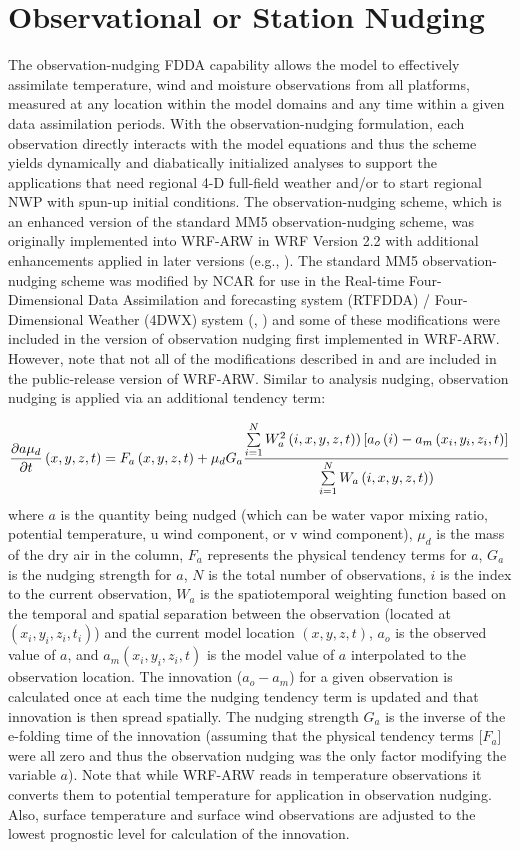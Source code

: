 \section{Observational or Station Nudging}

The observation-nudging FDDA capability allows the model to effectively assimilate temperature, wind and moisture observations from all platforms, measured at any location within the model domains and any time within a given data assimilation periods. With the observation-nudging formulation, each observation directly interacts with the model equations and thus the scheme yields dynamically and diabatically initialized analyses to support the applications that need regional 4-D full-field weather and/or to start regional NWP with spun-up initial conditions. The observation-nudging scheme, which is an enhanced version of the standard MM5 observation-nudging scheme, was originally implemented into WRF-ARW in WRF Version 2.2 with additional enhancements applied in later versions (e.g., \citet{deng09}). The standard MM5 observation-nudging scheme \citep{stauffer94} was modified by NCAR for use in the Real-time Four-Dimensional Data Assimilation and forecasting system (RTFDDA) / Four-Dimensional Weather (4DWX) system (\citet{liu05}, \citet{liu08}) and some of these modifications were included in the version of observation nudging first implemented in WRF-ARW.  However, note that not all of the modifications described in \citet{liu05} and \citet{liu08} are included in the public-release version of WRF-ARW.
Similar to analysis nudging, observation nudging is applied via an additional tendency term:


$$ {\partial a \mu_d \over \partial t}\left( x,y,z,t \right) = F_a\left( x,y,z,t \right) + \mu_d G_a { \sum\limits_{i=1}^{N} W^2_a\left(i,x,y,z,t)\right)\left[a_o\left( i \right) - a_m\left( x_i,y_i,z_i,t\right)\right] \over \sum\limits_{i=1}^{N} W_a\left(i,x,y,z,t)\right)} $$
where $a$ is the quantity being nudged (which can be water vapor mixing ratio, potential temperature, u wind component, or v wind component), $\mu_d$ is the mass of the dry air in the column, $F_a$ represents the physical tendency terms for $a$, $G_a$ is the nudging strength for $a$, $N$ is the total number of observations, $i$ is the index to the current observation, $W_a$ is the spatiotemporal weighting function based on the temporal and spatial separation between the observation (located at $(x_i, y_i, z_i, t_i)$) and the current model location $(x, y, z, t)$, $a_o$ is the observed value of $a$, and $a_m(x_i,y_i,z_i,t)$ is the model value of $a$ interpolated to the observation location.  The innovation ($a_o-a_m$) for a given observation is calculated once at each time the nudging tendency term is updated and that innovation is then spread spatially. The nudging strength $G_a$ is the inverse of the e-folding time of the innovation (assuming that the physical tendency terms [$F_a$] were all zero and thus the observation nudging was the only factor modifying the variable $a$).  Note that while WRF-ARW reads in temperature observations it converts them to potential temperature for application in observation nudging.  Also, surface temperature and surface wind observations are adjusted to the lowest prognostic level for calculation of the innovation.


